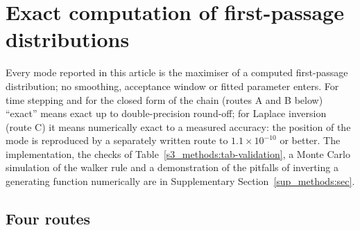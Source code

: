 \section{Exact computation of first-passage distributions}\label{s3_methods:sec}

Every mode reported in this article is the maximiser of a computed first-passage distribution; no smoothing,
acceptance window or fitted parameter enters. For time stepping and for the closed form of the chain (routes A and B
below) ``exact'' means exact up to double-precision round-off; for Laplace inversion (route C) it means numerically
exact to a measured accuracy: the position of the mode is reproduced by a separately written route to $1.1\times10^{-10}$
or better.
The implementation, the checks of Table~\ref{s3_methods:tab-validation}, a Monte Carlo simulation of the walker rule
and a demonstration of the pitfalls of inverting a generating function numerically are in Supplementary
Section~\ref{sup_methods:sec}.

\subsection{Four routes}\label{s3_methods:ssec-routes}

